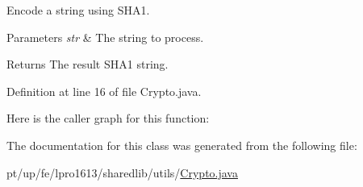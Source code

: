 Encode a string using S\+H\+A1. 
\begin{DoxyParams}{Parameters}
{\em str} & The string to process. \\
\hline
\end{DoxyParams}
\begin{DoxyReturn}{Returns}
The result S\+H\+A1 string. 
\end{DoxyReturn}


Definition at line 16 of file Crypto.\+java.

Here is the caller graph for this function\+:


The documentation for this class was generated from the following file\+:\begin{DoxyCompactItemize}
\item 
pt/up/fe/lpro1613/sharedlib/utils/\hyperlink{_crypto_8java}{Crypto.\+java}\end{DoxyCompactItemize}
